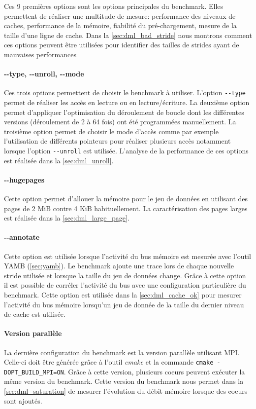         Ces 9 premières options sont les options principales du benchmark. Elles permettent de réaliser une multitude de mesure: performance des niveaux de caches, performance de la mémoire, fiabilité du pré-chargement, mesure de la taille d'une ligne de cache. Dans la \autoref{sec:dml_bad_stride} nous montrons comment ces options peuvent être utilisées pour identifier des tailles de strides ayant de mauvaises performances
    
    
        \paragraph{-{}-type, -{}-unroll, -{}-mode} Ces trois options permettent de choisir le benchmark à utiliser. L'option \verb|--type| permet de réaliser les accès en lecture ou en lecture/écriture. La deuxième option permet d'appliquer l'optimisation du déroulement de boucle dont les différentes versions (déroulement de 2 à 64 fois) ont été programmées manuellement. La troisième option permet de choisir le mode d'accès comme par exemple l'utilisation de différents pointeurs pour réaliser plusieurs accès notamment lorsque l'option \verb|--unroll| est utilisée. L'analyse de la performance de ces options est réalisée dans la \autoref{sec:dml_unroll}.

        \paragraph{-{}-hugepages} Cette option permet d'allouer la mémoire pour le jeu de données en utilisant des pages de 2 MiB contre 4 KiB habituellement. La caractérisation des pages larges est réalisée dans la \autoref{sec:dml_large_page}.
        
        \paragraph{-{}-annotate} Cette option est utilisée lorsque l'activité du bus mémoire est mesurée avec l'outil YAMB (\autoref{sec:yamb}). Le benchmark ajoute une trace lors de chaque nouvelle stride utilisée et lorsque la taille du jeu de données change. Grâce à cette option il est possible de corréler l'activité du bus avec une configuration particulière du benchmark. Cette option est utilisée dans la \autoref{sec:dml_cache_ok} pour mesurer l'activité du bus mémoire lorsqu'un jeu de donnée de la taille du dernier niveau de cache est utilisée. 

        \paragraph{Version parallèle} La dernière configuration du benchmark est la version parallèle utilisant MPI. Celle-ci doit être générée grâce à l'outil \textit{cmake} et la commande \verb|cmake -DOPT_BUILD_MPI=ON|. Grâce à cette version, plusieurs coeurs peuvent exécuter la même version du benchmark. Cette version du benchmark nous permet dans la \autoref{sec:dml_saturation} de mesurer l'évolution du débit mémoire lorsque des coeurs sont ajoutés.
        
